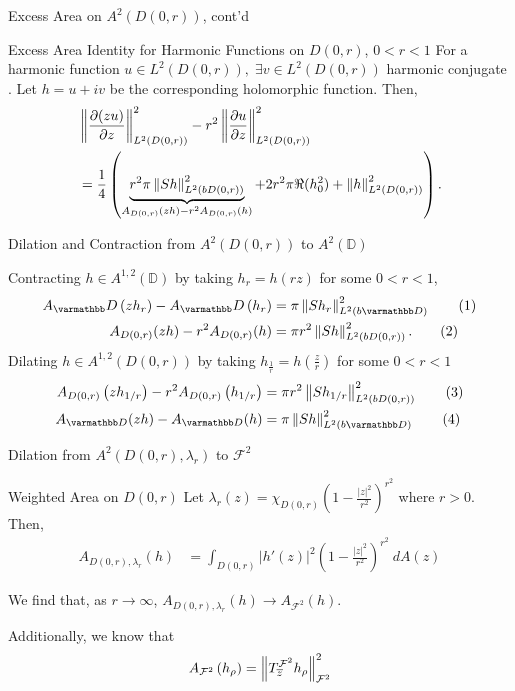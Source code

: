 \documentclass{reu_beamer}
\begin{document}
\begin{frame}{Excess Area on $A^{2}(D(0,r))$, cont'd}
    \begin{block}{Excess Area Identity for Harmonic Functions on $D(0,r)$, $0 < r < 1$}
    \small
        For a harmonic function $u\in L^2(D(0,r)),\;\exists v\in L^{2}\left(D(0,r)\right)$ harmonic conjugate \cite{bambico2022generalization}. Let $h=u+iv$ be the corresponding holomorphic function. Then, 
        \begin{align*}
            &\left\Vert \frac{\partial (zu)}{\partial z} \right\Vert^2_{L^2(D(0,r))}-r^2\left\Vert \frac{\partial u}{\partial z} \right\Vert^2_{L^2(D(0,r))}\\
            &=\frac{1}{4}\left(\underbrace{r^2\pi\left\Vert Sh \right\Vert_{L^2(b D(0,r))}^2}_{A_{D(0,r)}(zh) - r^2A_{D(0,r)}(h)}+2r^2\pi\Re(h_0^2)+\left\Vert h \right\Vert^2_{L^2(D(0,r))}\right).
        \end{align*}
    \end{block}
\end{frame}
\begin{frame}{Dilation and Contraction from $A^2(D(0,r))$ to $A^2(\mathbb{D})$}

    Contracting $h\in A^{1, 2}(\mathbb{D})$ by taking $h_r = h(rz)$ for some \(0 < r < 1\),
    \begin{align*}
        A_\disc\left(zh_{r}\right) - A_\disc\left(h_{r}\right) &= \pi \norm{Sh_{r}}_{L^2(b\mathbb{D})}^2\tag{1}\\
        A_{D(0,r)}(zh) - r^2 A_{D(0,r)}(h) &= \pi r^2 \norm{Sh}_{L^{2}(bD(0,r))}^2.\tag{2}
    \end{align*}
    Dilating $h \in A^{1,2}(D(0,r))$ by taking $h_{\frac{1}{r}}=h(\frac{z}{r})$ for some $0 < r < 1$
    \begin{align*}
        A_{D(0,r)}\left(zh_{1/r}\right) - r^2A_{D(0,r)}\left(h_{1/r}\right) &= \pi r^2 \norm{Sh_{1/r}}_{L^{2}(bD(0,r))}^2\tag{3}\\
        A_{\mathbb{D}}(zh) - A_{\mathbb{D}}(h) &= \pi \norm{Sh}_{L^{2}(b\mathbb{D})}^2\tag{4}
    \end{align*}
\end{frame}
\begin{frame}{Dilation from $A^2\left(D(0,r), \lambda_r\right)$ to $\mathcal{F}^2$}
    \begin{block}{Weighted Area on $D(0,r)$}
        Let $\lambda_r(z) = \chi_{D(0, r)}\left(1 - \frac{|z|^2}{r^2}\right)^{r^2}$ where \(r > 0\). Then,
        \begin{align*}
            A_{D(0, r),\lambda_r}(h) &= \int_{D(0,r)}\left\vert h'(z)\right\vert^2\left(1 - \frac{|z|^2}{r^2}\right)^{r^2}\: d A(z)
        \end{align*}
    \end{block}
    We find that, as $r\rightarrow\infty$, $A_{D(0, r),\lambda_r}(h) \rightarrow A_{\mathcal{F}^2}(h)$.\newline %
    
    Additionally, we know that
   \begin{align*}
      A_{\mathcal{F}^2}\left(h_{\rho}\right)&=\left\Vert T^{\mathcal{F}^2}_{\overline{z}}h_{\rho} \right\Vert^2_{\mathcal{F}^2}\\
   \end{align*}
\end{frame}
\end{document}
